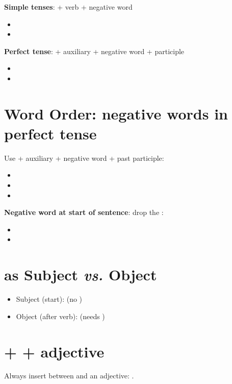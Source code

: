 \textbf{Simple tenses}:  + verb + negative word
\begin{itemize}[nosep]
    \item {}
    \item {}
\end{itemize}

\textbf{Perfect tense}:  + auxiliary + negative word + participle
\begin{itemize}[nosep]
    \item {}
    \item {}
\end{itemize}

\section{Word Order: negative words in perfect tense}
Use  + auxiliary + negative word + past participle:


\begin{itemize}[nosep]
    \item {}
    \item {}
    \item {}
\end{itemize}


\textbf{Negative word at start of sentence}: drop the :


\begin{itemize}[nosep]
    \item {}
    \item {}
\end{itemize}

\section{ as Subject \textit{vs.} Object}
\begin{itemize}[nosep]
    \item Subject (start):  (no )
    \item Object (after verb):  (needs )
\end{itemize}

\section{ +  + adjective}
Always insert  between  and an adjective:
. 

